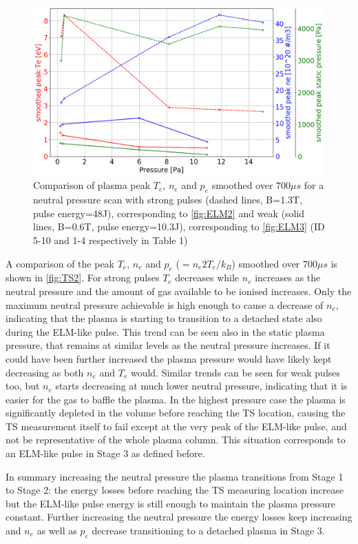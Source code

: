 \begin{figure}
	\centering
	\includegraphics[width=0.7\linewidth,trim={0 0 0 0},clip]{Chapters/chapter3/figs/pure_TS_compare.png}
	\caption{Comparison of plasma peak $T_e$, $n_e$ and $p_e$ smoothed over $700 \mu s$ for a neutral pressure scan with strong pulses (dashed lines, B=1.3T, pulse energy=48J), corresponding to \autoref{fig:ELM2} and weak (solid lines, B=0.6T, pulse energy=10.3J), corresponding to \autoref{fig:ELM3} (ID 5-10 and 1-4 respectively in Table 1)}
	\label{fig:TS2}
\end{figure}

A comparison of the peak $T_e$, $n_e$ and $p_e$ ($=n_e2T_e/k_B$) smoothed over $700 \mu s$ is shown in \autoref{fig:TS2}. For strong pulses $T_e$ decreases while $n_e$ increases as the neutral pressure and the amount of gas available to be ionised increases. Only the maximum neutral pressure achievable is high enough to cause a decrease of $n_e$, indicating that the plasma is starting to transition to a detached state also during the ELM-like pulse. This trend can be seen also in the static plasma pressure, that remains at similar levels as the neutral pressure increases. If it could have been further increased the plasma pressure would have likely kept decreasing as both $n_e$ and $T_e$ would. Similar trends can be seen for weak pulses too, but $n_e$ starts decreasing at much lower neutral pressure, indicating that it is easier for the gas to baffle the plasma. In the highest pressure case the plasma is significantly depleted in the volume before reaching the TS location, causing the TS measurement itself to fail except at the very peak of the ELM-like pulse, and not be representative of the whole plasma column. This situation corresponds to an ELM-like pulse in Stage 3 as defined before.

In summary increasing the neutral pressure the plasma transitions from Stage 1 to Stage 2: the energy losses before reaching the TS measuring location increase but the ELM-like pulse energy is still enough to maintain the plasma pressure constant. Further increasing the neutral pressure the energy losses keep increasing and $n_e$ as well as $p_e$ decrease transitioning to a detached plasma in Stage 3.

